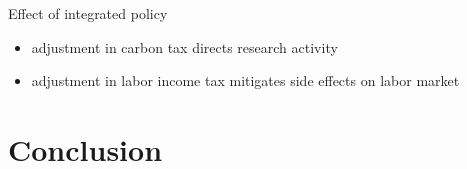 \documentclass[11pt,aspectratio=169]{beamer}
\begin{document}
\begin{frame}{Effect of integrated policy}
\begin{figure}
\begin{subfigure}{0.45\textwidth}
		\end{subfigure}
	\end{figure}
	\vspace{3mm}
	\begin{block}{}
		\begin{itemize}
			\item adjustment in carbon tax directs research activity 
			\item adjustment in labor income tax mitigates side effects on labor market
		\end{itemize}
	\end{block}	
\end{frame}


\hypertarget{conc}{}
\section{Conclusion}
\end{document}
